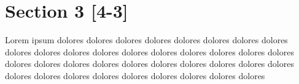 \section{Section 3 [4-3]}
\label{sec:33another}
Lorem ipsum dolores dolores dolores dolores dolores dolores dolores dolores dolores dolores dolores dolores dolores dolores dolores dolores dolores dolores dolores dolores dolores dolores dolores dolores dolores dolores dolores dolores dolores dolores dolores dolores dolores dolores dolores dolores dolores 